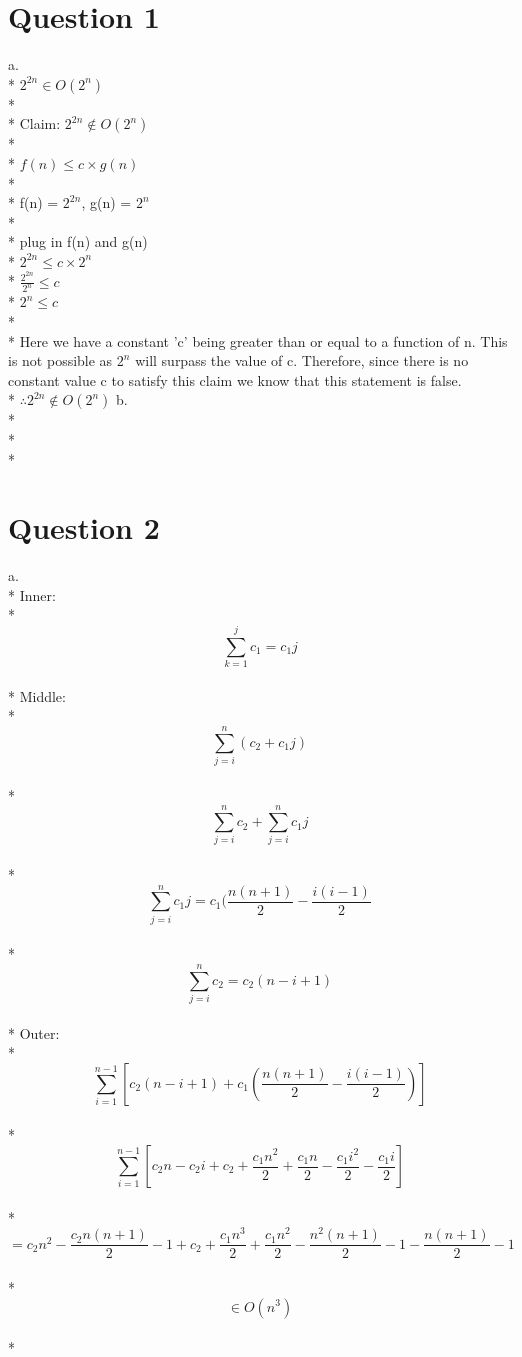 \documentclass[11pt]{article}
\newcommand\tab[1][1cm]{\hspace*{#1}}
\begin{document}
\maketitle



\section*{Question 1}
a.\\*
\tab $2^{2n} \in O(2^n)$\\*\\*
\tab Claim: $2^{2n} \notin O(2^n)$\\*\\*
\tab $f(n) \leq c \times g(n)$\\*\\*
\tab f(n) = $2^{2n}$, g(n) = $2^n$\\*\\*
\tab plug in f(n) and g(n)\\*
\tab $2^{2n} \leq c \times 2^n$\\*
\tab $\frac{2^{2n}}{2^n} \leq c$\\*
\tab $2^n \leq c$\\*\\*
\tab Here we have a constant 'c' being greater 
than or equal to a function of n. This is not 
possible as $2^n$ will surpass the value of c.
Therefore, since there is no constant value c
to satisfy this claim we know that this statement
is false.\\*
\tab $\therefore 2^{2n} \notin O(2^n)$\*
b.\\*\\*\\*


\section*{Question 2}
a.\\*
\tab Inner:\\*
\tab $$\sum_{k=1}^{j} c_1 = c_1j$$\\*
\tab Middle:\\*
\tab $$\sum_{j=i}^{n} (c_2 + c_1j)$$\\*
\tab $$\sum_{j=i}^{n} {c_2 + \sum_{j=i}^{n} c_1j}$$\\*
\tab $$\sum_{j=i}^{n} {c_1j} = c_1(\frac{n(n+1)}{2} - \frac{i(i-1)}{2}$$\\*
\tab $$\sum_{j=i}^{n} {c_2} = c_2(n - i + 1)$$\\*
\tab Outer:\\*
\tab $$\sum_{i=1}^{n-1}[c_2(n - i + 1) + c_1(\frac{n(n+1)}{2} - \frac{i(i-1)}{2})]$$\\*
\tab $$\sum_{i=1}^{n-1}[c_2n - c_2i + c_2 + \frac{c_1n^2}{2} + \frac{c_1n}{2} - \frac{c_1i^2}{2} - \frac{c_1i}{2}]$$\\*
\tab$$ = c_2n^2 - \frac{c_2n(n+1)}{2} - 1 + c_2 + \frac{c_1n^3}{2} + \frac{c_1n^2}{2} - \frac{n^2(n+1)}{2} - 1 - \frac{n(n+1)}{2} - 1$$\\*
\tab $$\in O(n^3)$$\\*
\end{document}
